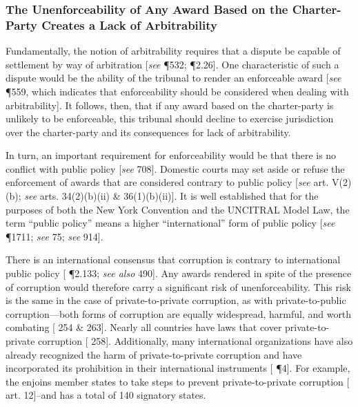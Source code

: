 \subsubsection{The Unenforceability of Any Award Based on the Charter-Party Creates a Lack of Arbitrability}

Fundamentally, the notion of arbitrability requires that a dispute be capable of settlement by way of arbitration [\textit{see} \cite{Fouchard Gaillard Goldman} \P 532; \cite{Redfern & Hunter} \P 2.26]. One characteristic of such a dispute would be the ability of the tribunal to render an enforceable award [\textit{see} \cite{Fouchard Gaillard Goldman} \P 559, which indicates that enforceability should be considered when dealing with arbitrability].  It follows, then, that if any award based on the charter-party is unlikely to be enforceable, this tribunal should decline to exercise jurisdiction over the charter-party and its consequences for lack of arbitrability.

In turn, an important requirement for enforceability would be that there is no conflict with public policy [\textit{see} \cite{Lamm et al.} 708].  Domestic courts may set aside or refuse the enforcement of awards that are considered contrary to public policy [\textit{see} \cite{New York Convention} art. V(2)(b); \textit{see} \cite{UNCITRAL Model Law} arts. 34(2)(b)(ii) & 36(1)(b)(ii)]. It is well established that for the purposes of both the New York Convention and the UNCITRAL Model Law, the term ``public policy'' means a higher ``international'' form of public policy [\textit{see} \cite{Fouchard Gaillard Goldman} \P 1711; \textit{see} \cite{Merkin Hjalmarsson} 75; \textit{see} \cite{Holtzmann Neuhaus} 914].

There is an international consensus that corruption is contrary to international public policy [\cite{Redfern & Hunter} \P 2.133; \textit{see also} \cite {Wilske Fox} 490]. Any awards rendered in spite of the presence of corruption would therefore carry a significant risk of unenforceability. This risk is the same in the case of private-to-private corruption, as with private-to-public corruption---both forms of corruption are equally widespread, harmful, and worth combating [\cite{Argandona} 254 & 263]. Nearly all countries have laws that cover private-to-private corruption [\cite{Argandona} 258]. Additionally, many international organizations have also already recognized the harm of private-to-private corruption and have incorporated its prohibition in their international instruments [\cite{ICC Memorandum to the OECD} \P 4]. For example, the \cite{United Nations Convention on Corruption} enjoins member states to take steps to prevent private-to-private corruption [\cite{United Nations Convention on Corruption} art. 12]--and has a total of 140 signatory states. 


